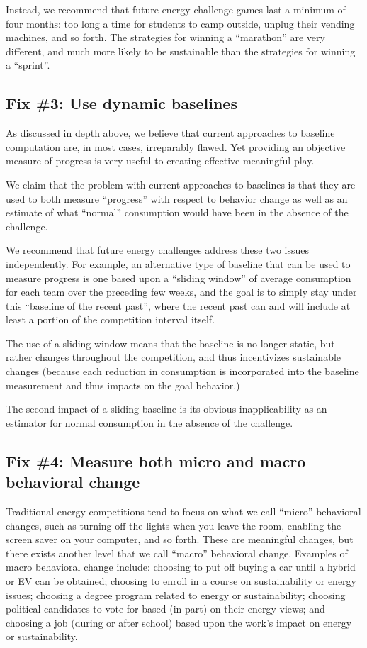 \documentclass[jou]{apa} %
\begin{document}
Instead, we recommend that future energy challenge games last a minimum of four months:
too long a time for students to camp outside, unplug their vending machines, and so forth.
The strategies for winning a ``marathon'' are very different, and much more likely to be
sustainable than the strategies for winning a ``sprint''.

\subsection{Fix \#3: Use dynamic baselines}

As discussed in depth above, we believe that current approaches to baseline computation
are, in most cases, irreparably flawed.  Yet providing an objective measure of progress is
very useful to creating effective meaningful play.  

We claim that the problem with current approaches to baselines is that they are used to
both measure ``progress'' with respect to behavior change as well as an estimate of what
``normal'' consumption would have been in the absence of the challenge.

We recommend that future energy challenges address these two issues independently.  For
example, an alternative type of baseline that can be used to measure progress is one based
upon a ``sliding window'' of average consumption for each team over the preceding few
weeks, and the goal is to simply stay under this ``baseline of the recent past'', where
the recent past can and will include at least a portion of the competition interval itself.

The use of a sliding window means that the baseline is no longer static, but rather
changes throughout the competition, and thus incentivizes sustainable changes (because each
reduction in consumption is incorporated into the baseline measurement and thus impacts on 
the goal behavior.)

The second impact of a sliding baseline is its obvious inapplicability as an estimator for
normal consumption in the absence of the challenge. 


\subsection{Fix \#4: Measure both micro and macro behavioral change}

Traditional energy competitions tend to focus on what we call ``micro'' behavioral
changes, such as turning off the lights when you leave the room, enabling the screen saver
on your computer, and so forth.  These are meaningful changes, but there exists another
level that we call ``macro'' behavioral change.  Examples of macro behavioral change
include: choosing to put off buying a car until a hybrid or EV can be obtained; choosing
to enroll in a course on sustainability or energy issues; choosing a degree program
related to energy or sustainability; choosing political candidates to vote for based (in
part) on their energy views; and choosing a job (during or after school) based upon the
work's impact on energy or sustainability.
\end{document}
